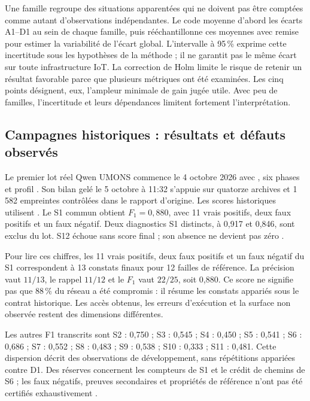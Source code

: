 \documentclass[11pt,a4paper]{article}
\DeclareRobustCommand{\code}[1]{{\small\path{#1}}}
\begin{document}
Une famille regroupe des situations apparentées qui ne doivent pas être
comptées comme autant d'observations indépendantes. Le code moyenne d'abord
les écarts A1--D1 au sein de chaque famille, puis rééchantillonne ces moyennes
avec remise pour estimer la variabilité de l'écart global. L'intervalle à
95\,\% exprime cette incertitude sous les hypothèses de la méthode ; il ne
garantit pas le même écart sur toute infrastructure IoT. La correction de Holm
limite le risque de retenir un résultat favorable parce que plusieurs métriques
ont été examinées. Les cinq points désignent, eux, l'ampleur minimale de gain
jugée utile. Avec peu de familles, l'incertitude et leurs dépendances limitent
fortement l'interprétation.

\subsection{Campagnes historiques : résultats et défauts observés}

Le premier lot réel Qwen UMONS commence le 4 octobre 2026 avec
\code{qwen3.8:27b}, six phases et profil \code{full}.
Son bilan gelé le 5 octobre à 11:32 s'appuie sur quatorze archives et
1\,582 empreintes contrôlées dans le rapport d'origine. Les scores historiques
utilisent \code{strict-v3.14/evidence-v13}. Le S1 commun obtient
\(F_1=0,880\), avec 11 vrais positifs, deux faux positifs et un faux négatif.
Deux diagnostics S1 distincts, à 0,917 et 0,846, sont exclus du lot.
S12 échoue sans score final ; son absence ne devient pas zéro
\cite{bench-qwen}.

Pour lire ces chiffres, les 11 vrais positifs, deux faux positifs et un faux
négatif du S1 correspondent à 13 constats finaux pour 12 failles de référence.
La précision vaut $11/13$, le rappel $11/12$ et le $F_1$ vaut $22/25$, soit
0,880. Ce score ne signifie pas que 88\,\% du réseau a été compromis : il résume
les constats appariés sous le contrat historique. Les accès obtenus, les erreurs
d'exécution et la surface non observée restent des dimensions différentes.

Les autres F1 transcrits sont S2 : 0,750 ; S3 : 0,545 ; S4 : 0,450 ;
S5 : 0,541 ; S6 : 0,686 ; S7 : 0,552 ; S8 : 0,483 ;
S9 : 0,538 ; S10 : 0,333 ; S11 : 0,481.
Cette dispersion décrit des observations de développement, sans répétitions
appariées contre D1. Des réserves concernent les compteurs de S1 et le crédit
de chemins de S6 ; les faux négatifs, preuves secondaires et propriétés de
référence n'ont pas été certifiés exhaustivement \cite{bench-qwen,bench-run1}.
\end{document}
